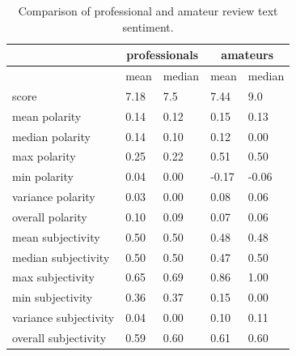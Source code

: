 \documentclass{sig-alternate}
\begin{document}
\begin{table}[tb]
\small
\sffamily
\begin{tabularx}{\linewidth}{lXXXX}
& \multicolumn{2}{c}{\textbf{professionals}} & \multicolumn{2}{c}{\textbf{amateurs}}  \\ 
\midrule & mean & median & mean & median \\ 

score & 7.18 & 7.5 & 7.44 & 9.0 \\ 

mean polarity & 0.14 & 0.12 & 0.15 & 0.13 \\ 
median polarity & 0.14 & 0.10 & 0.12 & 0.00 \\ 
max polarity & 0.25 & 0.22 & 0.51 & 0.50 \\ 
min polarity & 0.04 & 0.00 & -0.17 & -0.06 \\ 
variance polarity & 0.03 & 0.00 & 0.08 & 0.06 \\ 
overall polarity & 0.10 & 0.09 & 0.07 & 0.06 \\ 

mean subjectivity & 0.50 & 0.50 & 0.48 & 0.48 \\ 
median subjectivity & 0.50 & 0.50 & 0.47 & 0.50 \\ 
max subjectivity & 0.65 & 0.69 & 0.86 & 1.00 \\ 
min subjectivity & 0.36 & 0.37 & 0.15 & 0.00 \\ 
variance subjectivity & 0.04 & 0.00 & 0.10 & 0.11 \\ 
overall subjectivity & 0.59 & 0.60 & 0.61 & 0.60 \\ 

\end{tabularx}
\caption{Comparison of professional and amateur review text sentiment.}
\label{tab:review_pol_subj}
\end{table}
\end{document}
